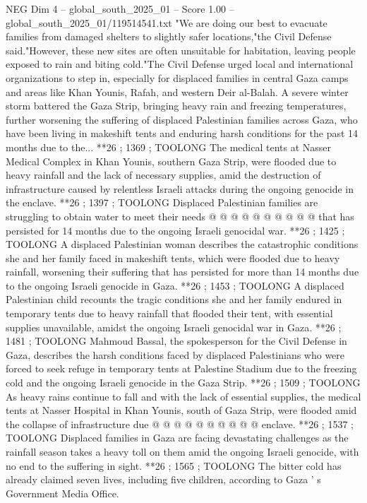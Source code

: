 \begin{textsample}{NEG Dim 4 – global\_south\_2025\_01 – Score 1.00 – global\_south\_2025\_01/119514541.txt}  \label{ex:f4_neg_442}
"We are doing our best to evacuate families from damaged shelters to slightly safer locations,"the Civil Defense said."However, these new sites are often unsuitable for habitation, leaving people exposed to rain and biting cold."The Civil Defense urged local and international organizations to step in, especially for displaced families in central Gaza camps and areas like Khan Younis, Rafah, and western Deir al-Balah.
A severe winter storm battered the Gaza Strip, bringing heavy rain and freezing temperatures, further worsening the suffering of displaced Palestinian families across Gaza, who have been living in makeshift tents and enduring harsh conditions for the past 14 months due to the... **26 ; 1369 ; TOOLONG The medical tents at Nasser Medical Complex in Khan Younis, southern Gaza Strip, were flooded due to heavy rainfall and the lack of necessary supplies, amid the destruction of infrastructure caused by relentless Israeli attacks during the ongoing genocide in the enclave. **26 ; 1397 ; TOOLONG Displaced Palestinian families are struggling to obtain water to meet their needs @ @ @ @ @ @ @ @ @ @ that has persisted for 14 months due to the ongoing Israeli genocidal war. **26 ; 1425 ; TOOLONG A displaced Palestinian woman describes the catastrophic conditions she and her family faced in makeshift tents, which were flooded due to heavy rainfall, worsening their suffering that has persisted for more than 14 months due to the ongoing Israeli genocide in Gaza. **26 ; 1453 ; TOOLONG A displaced Palestinian child recounts the tragic conditions she and her family endured in temporary tents due to heavy rainfall that flooded their tent, with essential supplies unavailable, amidst the ongoing Israeli genocidal war in Gaza. **26 ; 1481 ; TOOLONG Mahmoud Bassal, the spokesperson for the Civil Defense in Gaza, describes the harsh conditions faced by displaced Palestinians who were forced to seek refuge in temporary tents at Palestine Stadium due to the freezing cold and the ongoing Israeli genocide in the Gaza Strip. **26 ; 1509 ; TOOLONG As heavy rains continue to fall and with the lack of essential supplies, the medical tents at Nasser Hospital in Khan Younis, south of Gaza Strip, were flooded amid the collapse of infrastructure due @ @ @ @ @ @ @ @ @ @ enclave. **26 ; 1537 ; TOOLONG Displaced families in Gaza are facing devastating challenges as the rainfall season takes a heavy toll on them amid the ongoing Israeli genocide, with no end to the suffering in sight. **26 ; 1565 ; TOOLONG The bitter cold has already claimed seven lives, including five children, according to Gaza ' s Government Media Office.

\end{textsample}
